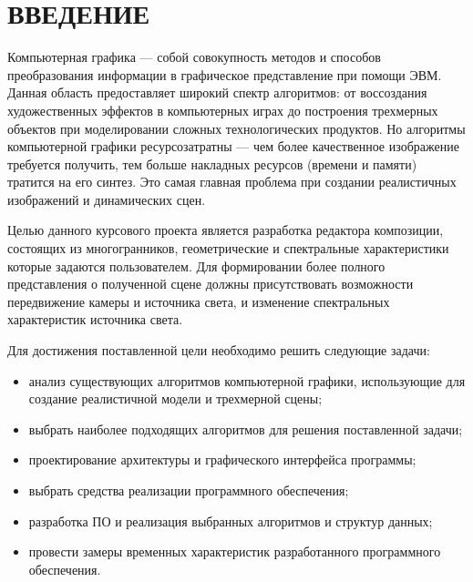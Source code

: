 \section*{\centering ВВЕДЕНИЕ}

Компьютерная графика --- собой совокупность методов и способов преобразования информации в графическое представление при помощи ЭВМ. Данная область предоставляет широкий спектр алгоритмов: от воссоздания художественных эффектов в компьютерных играх до построения трехмерных объектов при моделировании сложных технологических продуктов. Но алгоритмы компьютерной графики ресурсозатратны --- чем более качественное изображение требуется получить, тем больше накладных ресурсов (времени и памяти) тратится на его синтез. Это самая главная проблема при создании реалистичных изображений и динамических сцен. 

Целью данного курсового проекта является разработка редактора композиции, состоящих из многогранников, геометрические и спектральные характеристики которые задаются пользователем. Для формировании более полного представления о полученной сцене должны присутствовать возможности передвижение камеры и источника света, и изменение спектральных характеристик источника света.

Для достижения поставленной цели необходимо решить следующие задачи:
\begin{itemize}
	\item анализ существующих алгоритмов компьютерной графики, использующие для создание реалистичной модели и трехмерной сцены;
	\item выбрать наиболее подходящих алгоритмов для решения поставленной задачи;
	\item проектирование архитектуры и графического интерфейса программы;
	\item выбрать средства реализации программного обеспечения;
	\item разработка ПО и реализация выбранных алгоритмов и структур данных;
	\item провести замеры временных характеристик разработанного программного обеспечения.  
\end{itemize}
